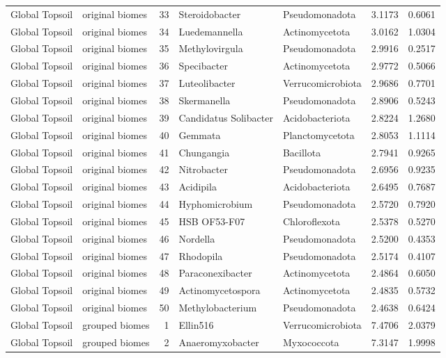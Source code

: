 \documentclass[12pt, oneside]{report}
\begin{document}
\begin{center}
\begin{longtable}{llrp{2.7cm}p{2.2cm}rr}
Global Topsoil & original biomes & 33 & Steroidobacter & Pseudomonadota & 3.1173 & 0.6061 \\
Global Topsoil & original biomes & 34 & Luedemannella & Actinomycetota & 3.0162 & 1.0304 \\
Global Topsoil & original biomes & 35 & Methylovirgula & Pseudomonadota & 2.9916 & 0.2517 \\
Global Topsoil & original biomes & 36 & Specibacter & Actinomycetota & 2.9772 & 0.5066 \\
Global Topsoil & original biomes & 37 & Luteolibacter & Verrucomicrobiota & 2.9686 & 0.7701 \\
Global Topsoil & original biomes & 38 & Skermanella & Pseudomonadota & 2.8906 & 0.5243 \\
Global Topsoil & original biomes & 39 & Candidatus Solibacter & Acidobacteriota & 2.8224 & 1.2680 \\
Global Topsoil & original biomes & 40 & Gemmata & Planctomycetota & 2.8053 & 1.1114 \\
Global Topsoil & original biomes & 41 & Chungangia & Bacillota & 2.7941 & 0.9265 \\
Global Topsoil & original biomes & 42 & Nitrobacter & Pseudomonadota & 2.6956 & 0.9235 \\
Global Topsoil & original biomes & 43 & Acidipila & Acidobacteriota & 2.6495 & 0.7687 \\
Global Topsoil & original biomes & 44 & Hyphomicrobium & Pseudomonadota & 2.5720 & 0.7920 \\
Global Topsoil & original biomes & 45 & HSB OF53-F07 & Chloroflexota & 2.5378 & 0.5270 \\
Global Topsoil & original biomes & 46 & Nordella & Pseudomonadota & 2.5200 & 0.4353 \\
Global Topsoil & original biomes & 47 & Rhodopila & Pseudomonadota & 2.5174 & 0.4107 \\
Global Topsoil & original biomes & 48 & Paraconexibacter & Actinomycetota & 2.4864 & 0.6050 \\
Global Topsoil & original biomes & 49 & Actinomycetospora & Actinomycetota & 2.4835 & 0.5732 \\
Global Topsoil & original biomes & 50 & Methylobacterium & Pseudomonadota & 2.4638 & 0.6424 \\
Global Topsoil & grouped biomes & 1 & Ellin516 & Verrucomicrobiota & 7.4706 & 2.0379 \\
Global Topsoil & grouped biomes & 2 & Anaeromyxobacter & Myxococcota & 7.3147 & 1.9998 \\

\end{longtable}
\end{center}
\end{document}

